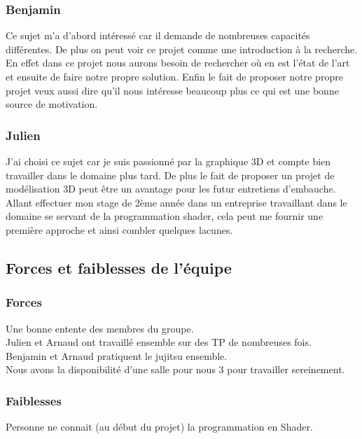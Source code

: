 \documentclass[a4paper,10pt]{article}
\begin{document}
\subsubsection{Benjamin}
        Ce sujet m'a d'abord intéressé car il demande de nombreuses capacités différentes. De plus on peut voir ce projet comme une introduction à la recherche. En effet dans ce projet nous aurons besoin de rechercher où en est l'état de l'art et ensuite de faire notre propre solution. Enfin le fait de proposer notre propre projet veux aussi dire qu'il nous intéresse beaucoup plus ce qui est une bonne source de motivation.\\
\subsubsection{Julien}
     J'ai choisi ce sujet car je suis passionné par la graphique 3D et compte bien travailler dans le domaine plus tard. De plus le fait de proposer un projet de modélisation 3D peut être un avantage pour les futur entretiens d'embauche. Allant effectuer mon stage de 2ème année dans un entreprise travaillant dans le domaine se servant de la programmation shader, cela peut me fournir une première approche et ainsi combler quelques lacunes.\\


\subsection{Forces et faiblesses de l'équipe}
\subsubsection{Forces}
Une bonne entente des membres du groupe.\\
Julien et Arnaud ont travaillé ensemble sur des TP de nombreuses fois.\\
Benjamin et Arnaud pratiquent le jujitsu ensemble.\\
Nous avons la disponibilité d'une salle pour nous 3 pour travailler sereinement.\\

\subsubsection{Faiblesses}
Personne ne connait (au début du projet) la programmation en Shader.\\
\end{document}
